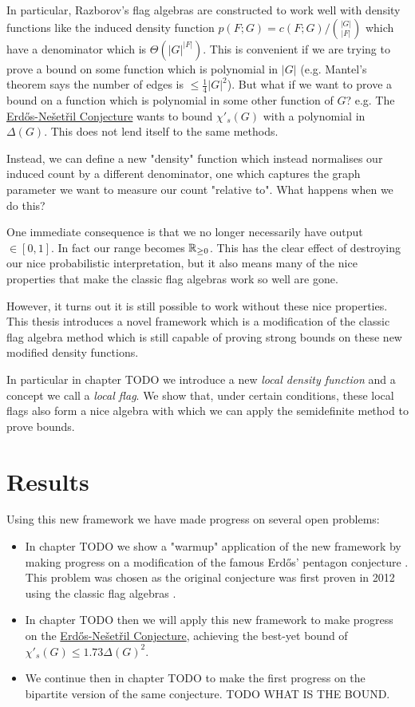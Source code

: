 In particular, Razborov's flag algebras are constructed to work well with density functions
like the induced density function $p(F; G) = c(F; G)/\binom{|G|}{|F|}$ which have a
denominator which is $\Theta(|G|^{|F|})$. This is convenient if we are trying to prove
a bound on some function which is polynomial in $|G|$
(e.g. Mantel's theorem says the number of edges is $\leq \frac{1}{4}|G|^2$). But what if
we want to prove a bound on a function which is polynomial in some other function
of $G$? e.g. The \hyperref[conj:erdos-nesetril]{Erd\H{o}s-Nešetřil Conjecture}
wants to bound $\chi'_s(G)$ with a polynomial in $\Delta(G).$ This does not lend itself
to the same methods.

Instead, we can define a new "density" function which instead normalises our induced
count by a different denominator, one which captures the graph parameter we want to measure
our count "relative to". What happens when we do this?

One immediate consequence is that we no longer necessarily have output $\in [0,1]$. In
fact our range becomes $\mathbb{R}_{\geq 0}$. This has the clear effect of destroying our nice
probabilistic interpretation, but it also means many of the nice properties that make
the classic flag algebras work so well are gone.

However, it turns out it is still possible to work without these nice properties.
This thesis introduces a novel framework which is a modification of the classic flag algebra
method which is still capable of proving strong bounds on these new modified density functions.

In particular in chapter TODO we introduce a
new \textit{local density function} and a concept we call a \textit{local flag}.
We show that, under certain conditions, these local flags also form a nice algebra
with which we can apply the semidefinite method to prove bounds.

\section*{Results}

Using this new framework we have made progress on several open problems:
\begin{itemize}
    \item In chapter TODO we show a "warmup" application of the new framework by making progress on
        a modification of the famous Erd\H{o}s' pentagon conjecture \cite{erdos_pentagon_1984}.
        This problem was chosen as the original conjecture was first proven in 2012 using
        the classic flag algebras \cite{grzesikMaximumNumberFivecycles2012}.
    \item In chapter TODO then we will apply this new framework to make progress on the
        \hyperref[conj:erdos-nesetril]{Erd\H{o}s-Nešetřil Conjecture}, achieving the best-yet
        bound of $\chi'_s(G) \leq 1.73\Delta(G)^2$.
    \item We continue then in chapter TODO to make the first progress on the bipartite version of
        the same conjecture. TODO WHAT IS THE BOUND.
\end{itemize}
